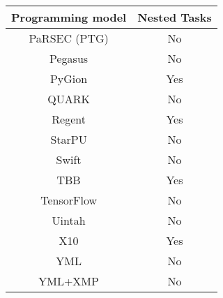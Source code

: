 \begin{tabular}{cc}
\hline
Programming model & Nested Tasks \\
\hline
PaRSEC (PTG) & No\\
Pegasus & No\\
PyGion & Yes\\
QUARK & No\\
Regent & Yes\\
StarPU & No\\
Swift & No\\
TBB & Yes\\
TensorFlow & No\\
Uintah & No\\
X10 & Yes\\
YML & No\\
YML+XMP & No\\
\hline
\end{tabular}
